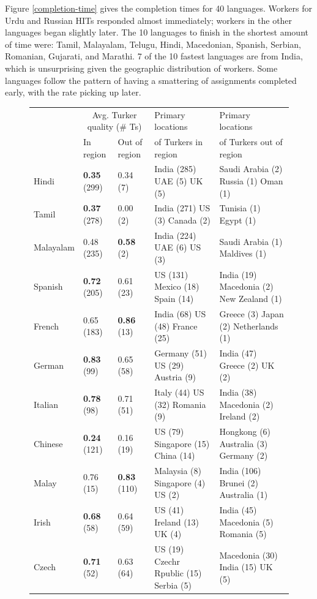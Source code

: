 \documentclass[11pt]{article}
\begin{document}
Figure \ref{completion-time} gives the completion times for 40 languages.  
Workers for Urdu and Russian HITs responded almost immediately; workers in the other languages began slightly later. The 10 languages to finish in the shortest amount of time were: Tamil, Malayalam, Telugu, Hindi, Macedonian, Spanish, Serbian, Romanian, Gujarati, and Marathi. 7 of the 10 fastest languages are from India, which is unsurprising given the geographic distribution of workers.  Some languages follow the pattern of having a smattering of assignments completed early, with the rate picking up later. 

\begin{figure}
\footnotesize
\begin{tabular}{lllll}
\hline\hline
&\multicolumn{2}{c}{Avg. Turker quality (\# Ts)}&Primary locations&Primary locations\\
&In region&Out of region&of Turkers in region&of Turkers out of region\\
\hline\hline
Hindi&\textbf{0.35} (299)&0.34 (7)&India (285) UAE (5) UK (5) &Saudi Arabia (2) Russia (1) Oman (1) \\
Tamil&\textbf{0.37} (278)&0.00 (2)&India (271) US (3) Canada (2) &Tunisia (1) Egypt (1) \\
Malayalam&0.48 (235) &\textbf{0.58} (2)&India (224) UAE (6) US (3) &Saudi Arabia (1) Maldives (1) \\
Spanish&\textbf{0.72} (205)&0.61 (23)&US (131) Mexico (18) Spain (14) &India (19) Macedonia (2) New Zealand (1) \\
French&0.65 (183) &\textbf{0.86} (13)&India (68) US (48) France (25) &Greece (3) Japan (2) Netherlands (1) \\
German&\textbf{0.83} (99)&0.65 (58)&Germany (51) US (29) Austria (9) &India (47) Greece (2) UK (2) \\
Italian&\textbf{0.78} (98)&0.71 (51)&Italy (44) US (32) Romania (9) &India (38) Macedonia (2) Ireland (2) \\
Chinese&\textbf{0.24} (121)&0.16 (19)&US (79) Singapore (15) China (14) &Hongkong (6) Australia (3) Germany (2) \\
Malay&0.76 (15) &\textbf{0.83} (110)&Malaysia (8) Singapore (4) US (2) &India (106) Brunei (2) Australia (1) \\
Irish&\textbf{0.68} (58)&0.64 (59)&US (41) Ireland (13) UK (4) &India (45) Macedonia (5) Romania (5) \\
Czech&\textbf{0.71} (52)&0.63 (64)&US (19) Czechr Rpublic (15) Serbia (5) &Macedonia (30) India (15) UK (5) \\

\end{tabular}
\end{figure}
\end{document}
